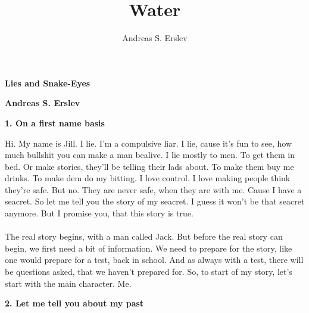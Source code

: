 \documentclass[]{article}
\title{Water}
\author{Andreas S. Erslev}
\begin{document}
\begin{center}
	\Large\textbf{Lies and Snake-Eyes}
\end{center}
\begin{center}
	\large\textbf{Andreas S. Erslev}
\end{center}

\begin{center}
	\large\textbf{1. On a first name basis}
\end{center}

Hi. My name is Jill. I lie. I'm a compulsive liar. I lie, cause it's fun to see, how much bullshit you can make a man bealive. I lie mostly to men. To get them in bed. Or make stories, they'll be telling their lads about. To make them buy me drinks. To make dem do my bitting. I love control. I love making people think they're safe. But no. They are never safe, when they are with me. Cause I have a seacret. So let me tell you the story of my seacret. I guess it won't be that seacret anymore. But I promise you, that this story is true.
\\ \\
The real story begins, with a man called Jack. But before the real story can begin, we first need a bit of information. We need to prepare for the story, like one would prepare for a test, back in school. And as always with a test, there will be questions asked, that we haven't prepared for. So, to start of my story, let's start with the main character. Me.

\begin{center}
	\large\textbf{2. Let me tell you about my past}
\end{center}
\end{document}
